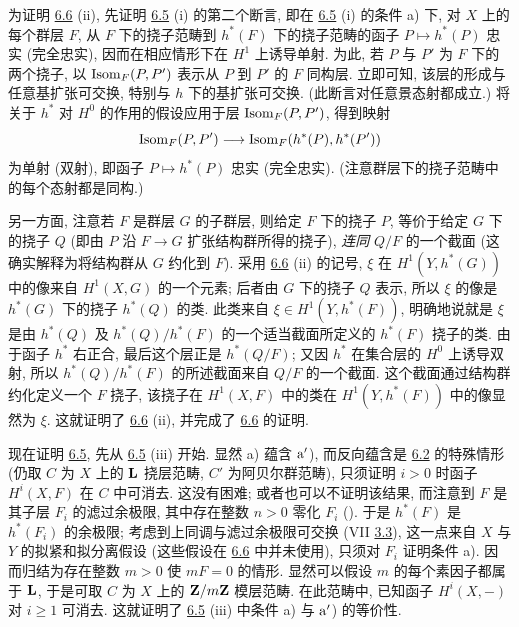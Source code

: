 为证明 \hyperref[XII.cor6.6]{6.6} (ii), 先证明 \hyperref[XII.prop6.5]{6.5} (i) 的第二个断言, 即在 \hyperref[XII.prop6.5]{6.5} (i) 的条件 a) 下, 对 $X$ 上的每个群层 $F$, 从 $F$ 下的挠子范畴到 $h^{\ast}(F)$ 下的挠子范畴的函子 $P\mapsto h^{\ast}(P)$ 忠实 (\resp 完全忠实), 因而在相应情形下在 $H^1$ 上诱导单射. 为此, 若 $P$ 与 $P'$ 为 $F$ 下的两个挠子, 以 $\protect\mathcal{\operatorname{Isom}}_F(P,P')$ 表示从 $P$ 到 $P'$ 的 $F$ 同构层. 立即可知, 该层的形成与任意基扩张可交换, 特别与 $h$ 下的基扩张可交换. (此断言对任意景态射都成立.) 将关于 $h^{\ast}$ 对 $H^{0}$ 的作用的假设应用于层 $\protect\mathcal{\operatorname{Isom}}_F(P,P')$, 得到映射
$$
\operatorname{Isom}_F(P,P')\longrightarrow
\operatorname{Isom}_F(h^{\ast}(P),h^{\ast}(P'))
$$
为单射 (\resp 双射), 即函子 $P\mapsto h^{\ast}(P)$ \pageoriginale 忠实 (\resp 完全忠实). (注意群层下的挠子范畴中的每个态射都是同构.)

另一方面, 注意若 $F$ 是群层 $G$ 的子群层, 则给定 $F$ 下的挠子 $P$, 等价于给定 $G$ 下的挠子 $Q$ (即由 $P$ 沿 $F\rightarrow G$ 扩张结构群所得的挠子), \emph{连同} $Q/F$ 的一个截面 (这确实解释为将结构群从 $G$ 约化到 $F$). 采用 \hyperref[XII.cor6.6]{6.6} (ii) 的记号, $\xi$ 在 $H^1(Y,h^{\ast}(G))$ 中的像来自 $H^1(X,G)$ 的一个元素; 后者由 $G$ 下的挠子 $Q$ 表示, 所以 $\xi$ 的像是 $h^{\ast}(G)$ 下的挠子 $h^{\ast}(Q)$ 的类. 此类来自 $\xi\in H^1(Y,h^{\ast}(F))$, 明确地说就是 $\xi$ 是由 $h^{\ast}(Q)$ 及 $h^{\ast}(Q)/h^{\ast}(F)$ 的一个适当截面所定义的 $h^{\ast}(F)$ 挠子的类. 由于函子 $h^{\ast}$ 右正合, 最后这个层正是 $h^{\ast}(Q/F)$; 又因 $h^{\ast}$ 在集合层的 $H^{0}$ 上诱导双射, 所以 $h^{\ast}(Q)/h^{\ast}(F)$ 的所述截面来自 $Q/F$ 的一个截面. 这个截面通过结构群约化定义一个 $F$ 挠子, 该挠子在 $H^1(X,F)$ 中的类在 $H^1(Y,h^{\ast}(F))$ 中的像显然为 $\xi$. 这就证明了 \hyperref[XII.cor6.6]{6.6} (ii), 并完成了 \hyperref[XII.cor6.6]{6.6} 的证明.

现在证明 \hyperref[XII.prop6.5]{6.5}, 先从 \hyperref[XII.prop6.5]{6.5} (iii) 开始. 显然 a) 蕴含 ${\rm a'}$), 而反向蕴含是 \hyperref[XII.lem6.2]{6.2} 的特殊情形 (仍取 $C$ 为 $X$ 上的 $\mathbf{L}$ 挠层范畴, $C'$ 为阿贝尔群范畴), 只须证明 $i>0$ 时函子 $H^{i}(X,F)$ 在 $C$ 中可消去. 这没有困难; 或者也可以\pageoriginale 不证明该结果, 而注意到 $F$ 是其子层 $F_i$ 的滤过余极限, 其中存在整数 $n>0$ 零化 $F_i$ (). 于是 $h^{\ast}(F)$ 是 $h^{\ast}(F_i)$ 的余极限; 考虑到上同调与滤过余极限可交换 (VII \hyperref[VII.prop3.3]{3.3}), 这一点来自 $X$ 与 $Y$ 的拟紧和拟分离假设 (这些假设在 \hyperref[XII.cor6.6]{6.6} 中并未使用), 只须对 $F_i$ 证明条件 a). 因而归结为存在整数 $m>0$ 使 $mF=0$ 的情形. 显然可以假设 $m$ 的每个素因子都属于 $\mathbf{L}$, 于是可取 $C$ 为 $X$ 上的 $\mathbf{Z}/m\mathbf{Z}$ 模层范畴. 在此范畴中, 已知函子 $H^{i}(X,-)$ 对 $i\geq1$ 可消去. 这就证明了 \hyperref[XII.prop6.5]{6.5} (iii) 中条件 a) 与 ${\rm a'}$) 的等价性.

